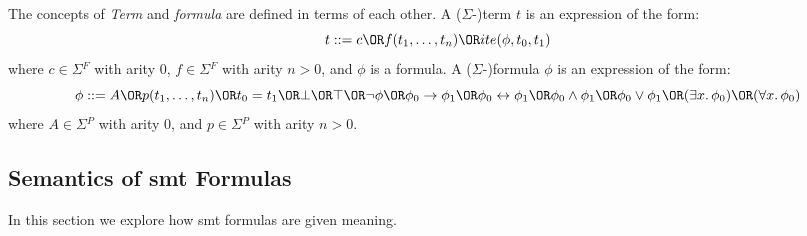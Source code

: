 \begin{definition}
  The concepts of \textit{Term} and \textit{formula} are defined in terms of
  each other. A ($\Sigma{}$-)term $t$ is an expression of the form:
  \[t ::= c \OR f(t_1,\ldots,t_n) \OR ite(\phi{}, t_0, t_1)\]
  where $c \in \Sigma{}^F$ with arity 0, $f \in \Sigma{}^F$ with arity
  $n > 0$, and $\phi{}$ is a formula.
  A ($\Sigma{}$-)formula $\phi{}$ is an expression of the form:
  \[\phi{} ::= A
    \OR p(t_1,\ldots,t_n)
    \OR t_0 = t_1
    \OR \bot{}
    \OR \top{}
    \OR \neg{}\phi{}
    \OR \phi{}_0 \rightarrow{} \phi{}_1
    \OR \phi{}_0 \leftrightarrow{} \phi{}_1
    \OR \phi{}_0 \land{} \phi{}_1
    \OR \phi{}_0 \lor{} \phi{}_1
    \OR (\exists{}x\ldotp\phi{}_0)
    \OR (\forall{}x\ldotp\phi{}_0)
  \]
  where $A \in \Sigma{}^P$ with arity 0, and $p \in \Sigma{}^P$ with arity
  $n > 0$.
\end{definition}





\subsection{Semantics of \gls{smt} Formulas}
\label{sec:smt-semantics}

In this section we explore how \gls{smt} formulas are given meaning.

